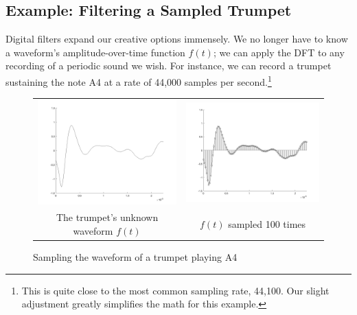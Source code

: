 \newpage

\subsection{Example: Filtering a Sampled Trumpet}

\par Digital filters expand our creative options immensely. We no longer have to know a waveform's amplitude-over-time function $f(t)$; we can apply the DFT to any recording of a periodic sound we wish. For instance, we can record a trumpet sustaining the note A4 at a rate of 44,000 samples per second.\footnote{This is quite close to the most common sampling rate, 44,100. Our slight adjustment greatly simplifies the math for this example.}

\begin{figure}[h]
    \centering
    \begin{tabular}{cc}
        \includegraphics[scale=.16]{trumpetA4_lineplot.png} & \includegraphics[scale=.16]{trumpetA4_stemplot.png}\\
        The trumpet's unknown waveform $f(t)$ & $f(t)$ sampled 100 times\\
    \end{tabular}
    \caption{Sampling the waveform of a trumpet playing A4}
    \label{fig:trumpetA4_sampled}
\end{figure}

